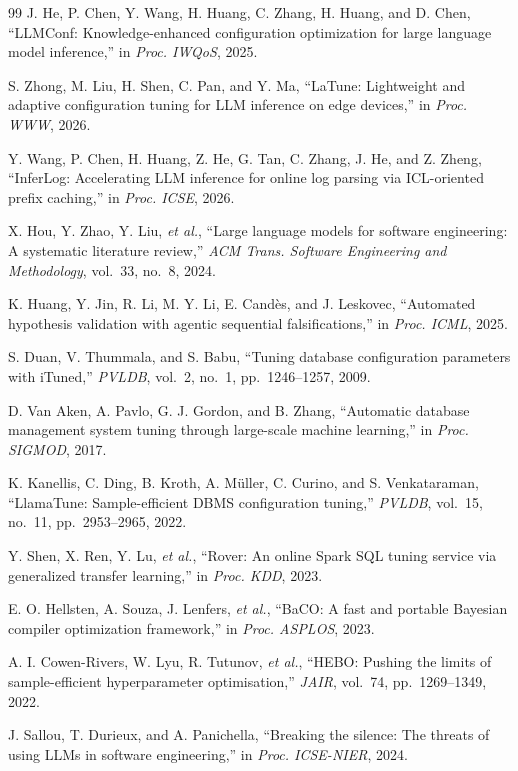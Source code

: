 \documentclass[journal]{IEEEtran}
\begin{document}
\begin{thebibliography}{99}
 J. He, P. Chen, Y. Wang, H. Huang, C. Zhang, H. Huang, and D. Chen, ``LLMConf: Knowledge-enhanced configuration optimization for large language model inference,'' in \emph{Proc. IWQoS}, 2025.

 S. Zhong, M. Liu, H. Shen, C. Pan, and Y. Ma, ``LaTune: Lightweight and adaptive configuration tuning for LLM inference on edge devices,'' in \emph{Proc. WWW}, 2026.

 Y. Wang, P. Chen, H. Huang, Z. He, G. Tan, C. Zhang, J. He, and Z. Zheng, ``InferLog: Accelerating LLM inference for online log parsing via ICL-oriented prefix caching,'' in \emph{Proc. ICSE}, 2026.

 X. Hou, Y. Zhao, Y. Liu, \emph{et al.}, ``Large language models for software engineering: A systematic literature review,'' \emph{ACM Trans. Software Engineering and Methodology}, vol.~33, no.~8, 2024.

 K. Huang, Y. Jin, R. Li, M. Y. Li, E. Cand\`es, and J. Leskovec, ``Automated hypothesis validation with agentic sequential falsifications,'' in \emph{Proc. ICML}, 2025.

 S. Duan, V. Thummala, and S. Babu, ``Tuning database configuration parameters with iTuned,'' \emph{PVLDB}, vol.~2, no.~1, pp.~1246--1257, 2009.

 D. Van Aken, A. Pavlo, G. J. Gordon, and B. Zhang, ``Automatic database management system tuning through large-scale machine learning,'' in \emph{Proc. SIGMOD}, 2017.

 K. Kanellis, C. Ding, B. Kroth, A. M\"uller, C. Curino, and S. Venkataraman, ``LlamaTune: Sample-efficient DBMS configuration tuning,'' \emph{PVLDB}, vol.~15, no.~11, pp.~2953--2965, 2022.

 Y. Shen, X. Ren, Y. Lu, \emph{et al.}, ``Rover: An online Spark SQL tuning service via generalized transfer learning,'' in \emph{Proc. KDD}, 2023.

 E. O. Hellsten, A. Souza, J. Lenfers, \emph{et al.}, ``BaCO: A fast and portable Bayesian compiler optimization framework,'' in \emph{Proc. ASPLOS}, 2023.

 A. I. Cowen-Rivers, W. Lyu, R. Tutunov, \emph{et al.}, ``HEBO: Pushing the limits of sample-efficient hyperparameter optimisation,'' \emph{JAIR}, vol.~74, pp.~1269--1349, 2022.

 J. Sallou, T. Durieux, and A. Panichella, ``Breaking the silence: The threats of using LLMs in software engineering,'' in \emph{Proc. ICSE-NIER}, 2024.

\end{thebibliography}
\end{document}
